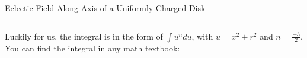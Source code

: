 \documentclass[12pt,aspectratio=169]{beamer}
\begin{document}
\begin{frame}{Eclectic Field Along Axis of a Uniformly Charged Disk}
  \begin{columns}
    
    Luckily for us, the integral is in the form of $\int u^ndu$,
    with $u=x^2+r^2$ and $n=\frac{-3}2$. You can find the integral in any math
    textbook:

  \end{columns}
\end{frame}



%
%
%
%
%
%
%    
%
%
%
%
\end{document}
